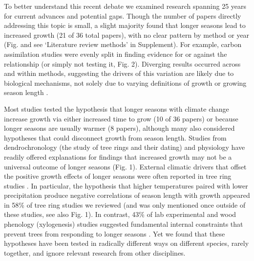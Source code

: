 \documentclass[11pt]{article}
\begin{document}
To better understand this recent debate we examined research spanning 25 years for current advances and potential gaps. Though the number of papers directly addressing this topic is small, a slight majority found that longer seasons lead to increased growth (21 of 36 total papers), with no clear pattern by method or year (Fig.  and see `Literature review methods' in Supplement). For example, carbon assimilation studies were evenly split in finding evidence for or against the relationship  (or simply not testing it, Fig. 2). Diverging results occurred across and within methods, suggesting the drivers of this variation are likely due to biological mechanisms, not solely due to varying definitions of growth or growing season length \citep[as some have recently suggested, e.g.][and see Box]{green2022limits,korner2023four}. 

Most studies tested the hypothesis that longer seasons with climate change increase growth via either increased time to grow (10 of 36 papers) or because longer seasons are usually warmer (8 papers), although many also considered hypotheses that could disconnect growth from season length. Studies from dendrochronology (the study of tree rings and their dating) and physiology have readily offered explanations for findings that increased growth may not be a universal outcome of longer seasons (Fig. 1). External climatic drivers that offset the positive growth effects of longer seasons were often reported in tree ring studies \citep{kolavr2016response,de2022temperature,camarero2022decoupled}. In particular, the hypothesis that higher temperatures paired with lower precipitation produce negative correlations of season length with growth appeared in 58\% of tree ring studies we reviewed (and was only mentioned once outside of these studies, see also Fig. 1). In contrast, 43\% of lab experimental and wood phenology (xylogenesis) studies suggested fundamental internal constraints that prevent trees from responding to longer seasons \citep[Fig S2][]{cuny2012life,michelot2012comparing,zohner2023effect}. Yet we found that these hypotheses have been tested in radically different ways on different species, rarely together, and ignore relevant research from other disciplines. 
 
\end{document}
